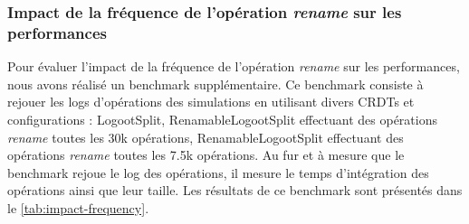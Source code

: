 \documentclass[12pt]{thesul}
\begin{document}
\subsubsection{Impact de la fréquence de l'opération \emph{rename} sur les performances}

Pour évaluer l'impact de la fréquence de l'opération \emph{rename} sur les performances, nous avons réalisé un benchmark supplémentaire.
Ce benchmark consiste à rejouer les logs d'opérations des simulations en utilisant divers \acp{CRDT} et configurations : LogootSplit, RenamableLogootSplit effectuant des opérations \emph{rename} toutes les 30k opérations, RenamableLogootSplit effectuant des opérations \emph{rename} toutes les 7.5k opérations.
Au fur et à mesure que le benchmark rejoue le log des opérations, il mesure le temps d'intégration des opérations ainsi que leur taille.
Les résultats de ce benchmark sont présentés dans le \autoref{tab:impact-frequency}.
\end{document}
